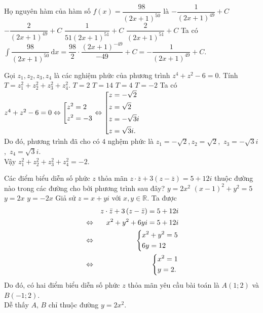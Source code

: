 \begin{ex}%
Họ nguyên hàm của hàm số $ f(x)=\dfrac{98}{(2x+1)^{50}} $	là
	\choice
	{\True $ -\dfrac{1}{(2x+1)^{49}}+C $}
	{$ -\dfrac{2}{(2x+1)^{49}}+C $}
	{$ \dfrac{1}{51(2x+1)^{51}}+C $}
	{$ \dfrac{2}{(2x+1)^{51}}+C $}
	\loigiai
	{Ta có $ \displaystyle\int \dfrac{98}{(2x+1)^{50}} \mathrm{\,d}x = \dfrac{98}{2} \cdot \dfrac{(2x+1)^{-49}}{-49}+C=-\dfrac{1}{(2x+1)^{49}}+C. $
	}
\end{ex}
\begin{ex}%
Gọi $ z_1,z_2,z_3,z_4 $	là các nghiệm phức của phương trình $ z^4+z^2-6=0 $. Tính $ T=z_1^2+z_2^2+z_3^2+z_4^2 $.
	\choice
	{$ T=2 $}
	{$ T=14 $}
	{$ T=4 $}
	{\True $ T=-2 $}
	\loigiai
	{Ta có $z^4+z^2-6=0 \Leftrightarrow \left[\begin{aligned}&z^2 = 2\\&z^2=-3\end{aligned}\right.  \Leftrightarrow \left[\begin{aligned}&z=-\sqrt{2}\\&z=\sqrt{2}\\&z=-\sqrt{3}i\\&z=\sqrt{3}i.\end{aligned}\right.$\\
	Do đó, phương trình đã cho có $ 4 $ nghệm phức là $ z_1=-\sqrt{2} $,\,$ z_2=\sqrt{2} $, \,$ z_3=-\sqrt{3}i $, \,$ z_4=\sqrt{3}i $.\\	Vậy $z_1^2+z_2^2+z_3^2+z_4^2 = -2.$}
\end{ex}
\begin{ex}%
Các điểm biểu diễn số phức $ z $	thỏa mãn $ z\cdot \bar{z} + 3\left(z-\bar{z}\right)=5+12i $ thuộc đường nào trong các đường cho bởi phương trình sau đây?
	\choice
	{\True $ y=2x^2 $}
	{$ (x-1)^2+y^2=5 $}
	{$ y=2x $}
	{$ y=-2x $}
	\loigiai
	{Giả sử $ z=x+yi $ với $ x,y \in \mathbb{R} $. Ta được
		\begin{eqnarray*}
&&z\cdot \bar{z} + 3\left(z-\bar{z}\right)=5+12i \\
&\Leftrightarrow& x^2+y^2+6yi=5+12i\\
&\Leftrightarrow& \left\{\begin{aligned}&x^2+y^2=5\\&6y=12\end{aligned}\right.\\
&\Leftrightarrow& \left\{\begin{aligned}&x^2=1\\&y=2.\end{aligned}\right.
		\end{eqnarray*}
Do đó, có hai điểm biểu diễn số phức $ z $ thỏa mãn yêu cầu bài toán là $ A(1;2) $ và $ B(-1;2) $.\\	Dễ thấy $ A,\,B $ chỉ  thuộc đường $ y=2x^2. $
	}
\end{ex}
